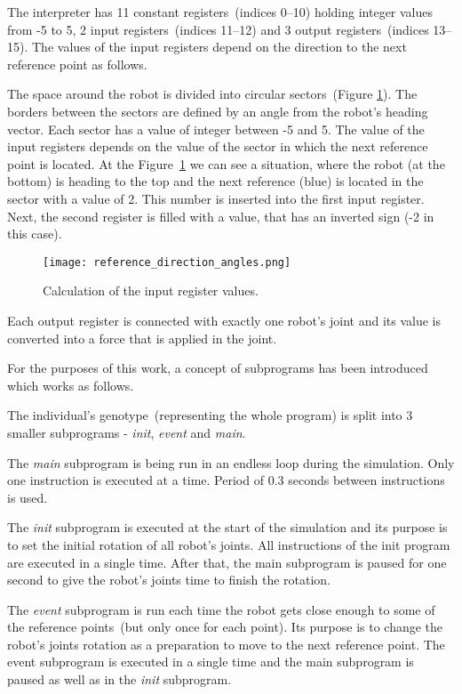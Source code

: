 \documentclass{ExcelAtFIT}
\begin{document}
The interpreter has 11 constant registers~(indices 0–10) holding integer values from -5 to 5, 2 input registers~(indices 11–12) and 3 output registers~(indices 13–15).
The values of the input registers depend on the direction to the next reference point as follows.

The space around the robot is divided into circular sectors~(Figure \ref{fig:ReferenceDirection}).
The borders between the sectors are defined by an angle from the robot's heading vector.
Each sector has a value of integer between -5 and 5.
The value of the input registers depends on the value of the sector in which the next reference point is located.
At the Figure~\ref{fig:ReferenceDirection} we can see a situation, where the robot (at the bottom) is heading to the top and the next reference (blue) is located in the sector with a value of 2.
This number is inserted into the first input register.
Next, the second register is filled with a value, that has an inverted sign (-2 in this case).

\begin{figure}[h]
	\centering
	{\texttt{[image: reference\_direction\_angles.png]}}
	\caption{
		Calculation of the input register values.
	}
	\label{fig:ReferenceDirection}
\end{figure}

Each output register is connected with exactly one robot's joint and its value is converted into a force that is applied in the joint.

For the purposes of this work, a concept of subprograms has been introduced which works as follows.

The individual's genotype~(representing the whole program) is split into 3 smaller subprograms - \textit{init}, \textit{event} and \textit{main}.

The \textit{main} subprogram is being run in an endless loop during the simulation.
Only one instruction is executed at a time.
Period of 0.3 seconds between instructions is used.

The \textit{init} subprogram is executed at the start of the simulation and its purpose is to set the initial rotation of all robot's joints.
All instructions of the init program are executed in a single time.
After that, the main subprogram is paused for one second to give the robot's joints time to finish the rotation.

The \textit{event} subprogram is run each time the robot gets close enough to some of the reference points~(but only once for each point).
Its purpose is to change the robot's joints rotation as a preparation to move to the next reference point.
The event subprogram is executed in a single time and the main subprogram is paused as well as in the \textit{init} subprogram.
\end{document}
